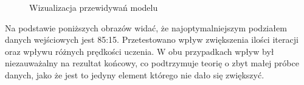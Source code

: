 \documentclass[12pt,a4paper]{article}
\begin{document}
	        \begin{figure}[h!]
        			\centering
        			\label{perceptron_wykres1}
        			\hfil
        			\label{perceptron_wykres2}
     
        			\label{perceptron_wykres3}
        			\hfil
        			\label{perceptron_wykres4}
        			\caption{Wizualizacja przewidywań modelu}
        		\end{figure}
	            Na podstawie poniższych obrazów widać, że najoptymalniejszym podziałem danych wejściowych jest 85:15. 
	            Przetestowano wpływ zwiększenia ilości iteracji oraz wpływu różnych prędkości uczenia. W obu przypadkach wpływ był niezauważalny na rezultat końcowy, co podtrzymuje teorię o zbyt małej próbce danych, jako że jest to jedyny element którego nie dało się zwiększyć.
	        
\end{document}
